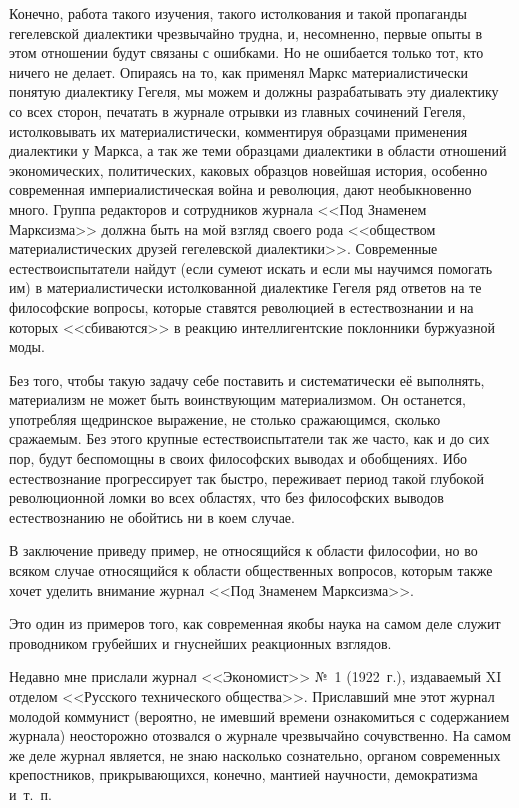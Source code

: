 Конечно, работа такого изучения, такого истолкования и такой пропаганды
гегелевской диалектики чрезвычайно трудна, и, несомненно, первые опыты в
этом отношении будут связаны с ошибками. Но не ошибается только тот, кто
ничего не делает. Опираясь на то, как применял Маркс материалистически
понятую диалектику Гегеля, мы можем и должны разрабатывать эту диалектику
со всех сторон, печатать в журнале отрывки из главных сочинений Гегеля,
истолковывать их материалистически, комментируя образцами применения
диалектики у Маркса, а так же теми образцами диалектики в области отношений
экономических, политических, каковых образцов новейшая история, особенно
современная империалистическая война и революция, дают необыкновенно много.
Группа редакторов и сотрудников журнала <<Под Знаменем Марксизма>> должна
быть на мой взгляд своего рода <<обществом материалистических друзей
гегелевской диалектики>>. Современные естествоиспытатели найдут (если сумеют
искать и если мы научимся помогать им) в материалистически истолкованной
диалектике Гегеля ряд ответов на те философские вопросы, которые ставятся
революцией в естествознании и на которых <<сбиваются>> в реакцию
интеллигентские поклонники буржуазной моды.

Без того, чтобы такую задачу себе поставить и систематически её выполнять,
материализм не может быть воинствующим материализмом. Он останется,
употребляя щедринское выражение, не столько сражающимся, сколько сражаемым.
Без этого крупные естествоиспытатели так же часто, как и до сих пор, будут
беспомощны в своих философских выводах и обобщениях. Ибо естествознание
прогрессирует так быстро, переживает период такой глубокой революционной
ломки во всех областях, что без философских выводов естествознанию не
обойтись ни в коем случае.

В заключение приведу пример, не относящийся к области философии, но во
всяком случае относящийся к области общественных вопросов, которым также
хочет уделить внимание журнал <<Под Знаменем Марксизма>>.

Это один из примеров того, как современная якобы наука на самом деле служит
проводником грубейших и гнуснейших реакционных взглядов.

Недавно мне прислали журнал <<Экономист>> №~1 (1922~г.),
издаваемый XI отделом <<Русского технического общества>>. Приславший мне этот
журнал молодой коммунист (вероятно, не имевший времени ознакомиться с
содержанием журнала) неосторожно отозвался о журнале чрезвычайно
сочувственно. На самом же деле журнал является, не знаю насколько
сознательно, органом современных крепостников, прикрывающихся, конечно,
мантией научности, демократизма и~т.~п.

